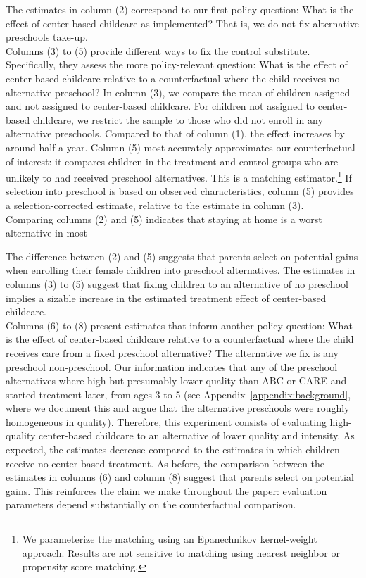\noindent The estimates in column (2) correspond to our first policy question: What is the effect of center-based childcare as implemented? That is, we do not fix alternative preschools take-up.\\

\noindent Columns (3) to (5) provide different ways to fix the control substitute. Specifically, they assess the more policy-relevant question: What is the effect of center-based childcare relative to a counterfactual where the child receives no alternative preschool? In column (3), we compare the mean of children assigned and not assigned to center-based childcare. For children not assigned to center-based childcare, we restrict the sample to those who did not enroll in any alternative preschools. Compared to that of column (1), the effect increases by around half a year. Column (5) most accurately approximates our counterfactual of interest: it compares children in the treatment and control groups who are unlikely to had received preschool alternatives. This is a matching estimator.\footnote{We parameterize the matching using an Epanechnikov kernel-weight approach. Results are not sensitive to matching using nearest neighbor or propensity score matching.} If selection into preschool is based on observed characteristics, column (5) provides a selection-corrected estimate, relative to the estimate in column (3).\\ 

\noindent Comparing columns (2) and (5) indicates that staying at home is a worst alternative in most 


 The difference between (2) and (5) suggests that parents select on potential gains when enrolling their female children into preschool alternatives. The estimates in columns (3) to (5) suggest that fixing children to an alternative of no preschool implies a sizable increase in the estimated treatment effect of center-based childcare. \\

\noindent Columns (6) to (8) present estimates that inform another policy question: What is the effect of center-based childcare relative to a counterfactual where the child receives care from a fixed preschool alternative? The alternative we fix is any preschool non-preschool. Our information indicates that any of the preschool alternatives where high but presumably lower quality than ABC or CARE and started treatment later, from ages 3 to 5 (see Appendix~\ref{appendix:background}, where we document this and argue that the alternative preschools were roughly homogeneous in quality). Therefore, this experiment consists of evaluating high-quality center-based childcare to an alternative of lower quality and intensity. As expected, the estimates decrease compared to the estimates in which children receive no center-based treatment. As before, the comparison between the estimates in columns (6) and column (8) suggest that parents select on potential gains. This reinforces the claim we make throughout the paper: evaluation parameters depend substantially on the counterfactual comparison.\\

